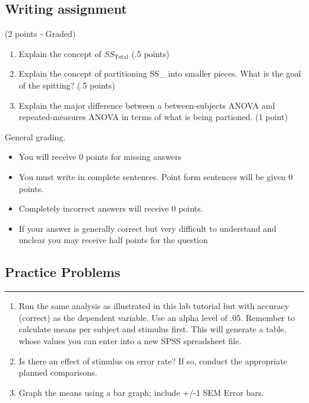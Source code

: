 \documentclass[
]{book}
\providecommand{\tightlist}{%
  \setlength{\itemsep}{0pt}\setlength{\parskip}{0pt}}
\begin{document}
\hypertarget{writing-assignment-8}{%
\subsection{Writing assignment}\label{writing-assignment-8}}

(2 points - Graded)

\begin{enumerate}
\def\labelenumi{\arabic{enumi}.}
\item
  Explain the concept of \(SS_\text{Total}\) (.5 points)
\item
  Explain the concept of partitioning SS\_ into smaller pieces. What is the goal of the spitting? (.5 points)
\item
  Explain the major difference between a between-subjects ANOVA and repeated-measures ANOVA in terms of what is being partioned. (1 point)
\end{enumerate}

General grading.

\begin{itemize}
\tightlist
\item
  You will receive 0 points for missing answers
\item
  You must write in complete sentences. Point form sentences will be given 0 points.
\item
  Completely incorrect answers will receive 0 points.
\item
  If your answer is generally correct but very difficult to understand and unclear you may receive half points for the question
\end{itemize}

\hypertarget{practice-problems-7}{%
\subsection{Practice Problems}\label{practice-problems-7}}

\begin{center}\rule{0.5\linewidth}{0.5pt}\end{center}

\begin{enumerate}
\def\labelenumi{\arabic{enumi}.}
\item
  Run the same analysis as illustrated in this lab tutorial but with accuracy (correct) as the dependent variable. Use an alpha level of .05. Remember to calculate means per subject and stimulus first. This will generate a table, whose values you can enter into a new SPSS spreadsheet file.
\item
  Is there an effect of stimulus on error rate? If so, conduct the appropriate planned comparisons.
\item
  Graph the means using a bar graph; include +/-1 SEM Error bars.
\end{enumerate}
\end{document}
